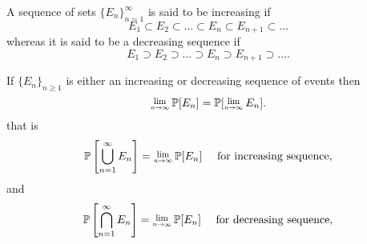 \begin{definition}
    A sequence of sets $\{E_n \}^\infty_{n=1}$ is said to be increasing if 
    \[
        E_1 \subset E_2 \subset \ldots \subset E_n \subset E_{n+1} \subset \ldots
    \]
    whereas it is said to be a decreasing sequence if 
    \[
        E_1 \supset E_2 \supset \ldots \supset E_n \supset E_{n+1} \supset \ldots.
    \]
\end{definition}

\begin{lemma}
    If $\{E_n\}_{n \geq 1}$ is either an increasing or decreasing sequence of events then 
    \begin{equation}
        \Lim{n \to \infty} \mathbb{P}[E_n] = \mathbb{P}[\Lim{n \to \infty} E_n].
    \end{equation}
    that is 
    \begin{equation}
        \mathbb{P} \left[ \bigcup^{\infty}_{n=1} E_n \right] = \Lim{n \to \infty} \mathbb{P}[E_n]
        \quad \text{ for increasing sequence},
    \end{equation}
    and 
    \begin{equation}
        \mathbb{P} \left[ \bigcap^{\infty}_{n=1} E_n \right] = \Lim{n \to \infty} \mathbb{P}[E_n]
        \quad \text{ for decreasing sequence},
    \end{equation}
\end{lemma}

